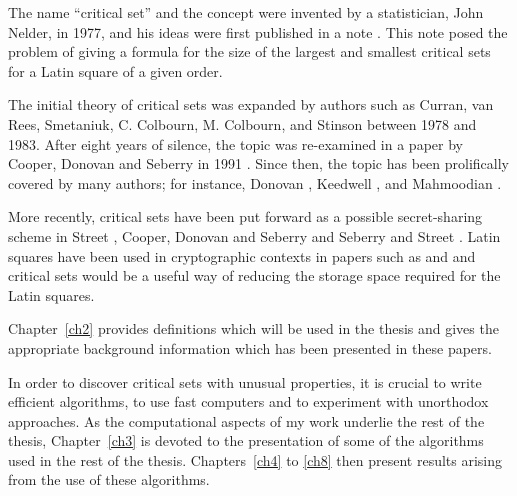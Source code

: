 \documentclass[12pt]{report}
\begin{document}
The name ``critical set'' and the concept were invented by a statistician,
John Nelder, in 1977, and his ideas were first published in a note
\cite{Nel1}.  This note posed the problem of giving a formula for the
size of the largest and smallest critical sets for a Latin square of a
given order.

The initial theory of critical sets was expanded by authors such
as Curran, van Rees, Smetaniuk, C. Colbourn, M. Colbourn, and
Stinson \cite{MR80j:05022,MR81d:05015,MR84g:05036,MR85k:68035}
between 1978 and 1983.  After eight years of silence,
the topic was re-examined in a paper by Cooper, Donovan and
Seberry in 1991 \cite{MR92i:05049}.  Since then, the topic has
been prolifically covered by many authors; for instance, Donovan
\cite{MR1758263,MR99k:05038,MR99i:05039,MR99a:05018,MR98a:05030,MR97g:05032,
MR95k:05030,MR95j:05043}, Keedwell \cite{
MR99j:05036,MR97i:05017,MR97f:05031,
MR96a:05027,MR1605114}, and Mahmoodian
\cite{MR2000b:05023,MR99i:05084,MR99b:05060,MR98e:05019,MR98b:05044}.

More recently, critical sets have been put forward as a possible
secret-sharing scheme in Street \cite{MR93c:05026}, Cooper, Donovan
and Seberry \cite{MR95j:05043} and Seberry and Street \cite{MR1760181}.  Latin squares
have been used in cryptographic contexts in papers such as \cite{desv}
and \cite{MR98i:94027} and critical sets would be a useful way of reducing
the storage space required for the Latin squares.

Chapter~\ref{ch2} provides definitions which will be used in the thesis and gives
the appropriate background information which has been presented in
these papers.

In order to discover critical sets with unusual properties, it is crucial
to write efficient algorithms, to use fast computers and to experiment
with unorthodox approaches.  As the computational aspects of my work
underlie the rest of the thesis, Chapter~\ref{ch3} is devoted to the presentation
of some of the algorithms used in the rest of the thesis.  Chapters~\ref{ch4}
to \ref{ch8} then present results arising from the use of these algorithms.
\end{document}
